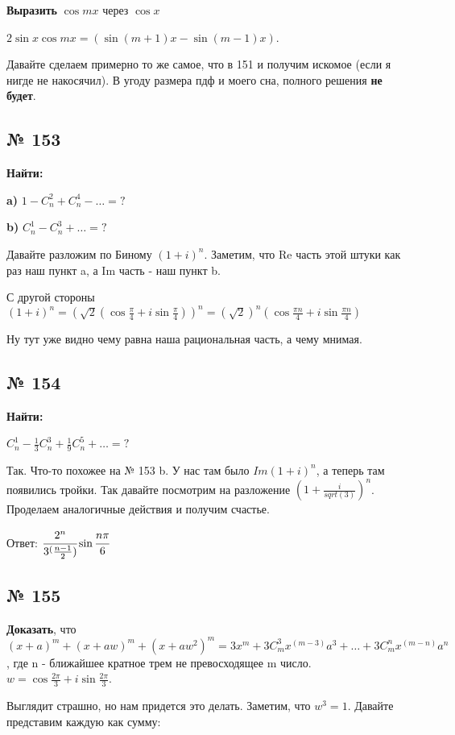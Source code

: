 \documentclass{article}
\begin{document}
\textbf{Выразить} $\cos mx$ через $\cos x$

$2 \sin x \cos mx = (\sin (m+1)x - \sin(m-1)x)$.

Давайте сделаем примерно то же самое, что в 151 и получим искомое (если я нигде не накосячил). В угоду размера пдф и моего сна, полного решения \textbf{не будет}.
\pagebreak
\subsection{№ 153}

\textbf{Найти:}

\textbf{a)} $1 - C_n^2 + C_n^4 - \ldots=?$

\textbf{b)} $C_n^1-C_n^3 + \ldots =?$

Давайте разложим по Биному $(1+i)^n$. Заметим, что Re часть  этой штуки как раз наш пункт a, а Im часть - наш пункт b.

С  другой стороны $(1+i)^n = (\sqrt{2}(\cos \frac{\pi}{4}+i\sin \frac{\pi}{4}))^n=(\sqrt{2})^n (\cos \frac{\pi n}{4} + i \sin \frac{\pi n}{4})$

Ну тут уже видно чему равна наша рациональная часть, а чему мнимая.
\pagebreak

\subsection{№  154}

\textbf{Найти:}

 $C_n^1-\frac{1}{3}C_n^3 + \frac{1}{9}C_n^5+\ldots=?$

Так. Что-то похожее на № 153 b. У нас там было $Im(1+i)^n$, а теперь там появились тройки. Так давайте посмотрим на разложение $(1+\frac{i}{sqrt(3)})^n$. Проделаем аналогичные действия и получим счастье.

Ответ: $\cfrac{2^n}{3^(\frac{n-1}{2})}\sin \cfrac{n\pi}{6}$
\pagebreak

\subsection{№ 155}

\textbf{Доказать}, что $(x+a)^m + (x+aw)^m+(x+aw^2)^m = 3x^m + 3C_m^3x^{(m-3)}a^3 + \ldots +3C_m^nx^{(m-n)}a^n$, где n - ближайшее кратное трем не превосходящее m число. $w =\cos \frac{2\pi}{3} + i\sin \frac{2\pi}{3}$.

Выглядит страшно, но нам придется это делать. Заметим, что $w^3=1$. Давайте представим каждую как сумму:
\end{document}
